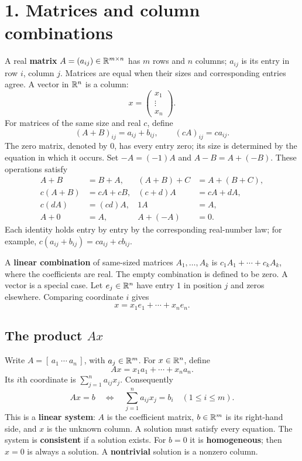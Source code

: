 \section*{1. Matrices and column combinations}

A real \textbf{matrix} \(A=(a_{ij})\in\mathbb R^{m\times n}\) has \(m\) rows and
\(n\) columns; \(a_{ij}\) is its entry in row \(i\), column \(j\).
Matrices are equal when their sizes and corresponding entries agree.
A vector in \(\mathbb R^n\) is a column:
\[
x=\begin{pmatrix}x_1\\\vdots\\x_n\end{pmatrix}.
\]
For matrices of the same size and real \(c\), define
\[
(A+B)_{ij}=a_{ij}+b_{ij},\qquad(cA)_{ij}=ca_{ij}.
\]
The zero matrix, denoted by \(0\), has every entry zero; its size is determined
by the equation in which it occurs. Set \(-A=(-1)A\) and \(A-B=A+(-B)\).
These operations satisfy
\begin{align*}
A+B&=B+A,&(A+B)+C&=A+(B+C),\\
c(A+B)&=cA+cB,&(c+d)A&=cA+dA,\\
c(dA)&=(cd)A,&1A&=A,\\
A+0&=A,&A+(-A)&=0.
\end{align*}
Each identity holds entry by entry by the corresponding real-number law;
for example, \(c(a_{ij}+b_{ij})=ca_{ij}+cb_{ij}\).

A \textbf{linear combination} of same-sized matrices \(A_1,\ldots,A_k\)
is \(c_1A_1+\cdots+c_kA_k\), where the coefficients are real.
The empty combination is defined to be zero. A vector is a special case.
Let \(e_j\in\mathbb R^n\) have entry \(1\) in position \(j\) and zeros elsewhere.
Comparing coordinate \(i\) gives
\[
x=x_1e_1+\cdots+x_ne_n.
\]

\subsection*{The product \(Ax\)}
Write \(A=[\,a_1\ \cdots\ a_n\,]\), with \(a_j\in\mathbb R^m\).
For \(x\in\mathbb R^n\), define
\[
\boxed{Ax=x_1a_1+\cdots+x_na_n.}
\]
Its \(i\)th coordinate is \(\sum_{j=1}^n a_{ij}x_j\). Consequently
\[
Ax=b\quad\Longleftrightarrow\quad
\sum_{j=1}^n a_{ij}x_j=b_i\quad(1\leqslant i\leqslant m).
\]
This is a \textbf{linear system}: \(A\) is the coefficient matrix,
\(b\in\mathbb R^m\) is its right-hand side, and \(x\) is the unknown column.
A solution must satisfy every equation. The system is \textbf{consistent}
if a solution exists. For \(b=0\) it is \textbf{homogeneous}; then \(x=0\)
is always a solution. A \textbf{nontrivial} solution is a nonzero column.

